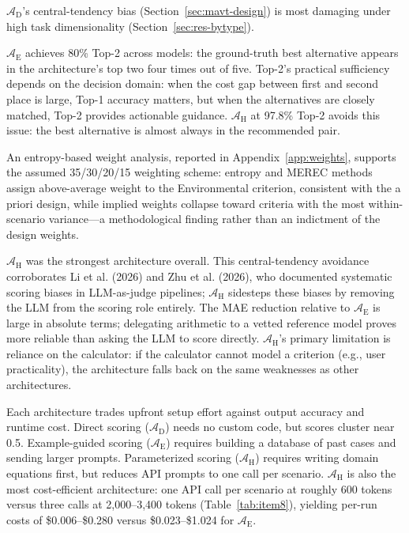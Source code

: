 \documentclass[a4paper,fleqn]{cas-dc}
\begin{document}
$\mathcal{A}_{\text{D}}$'s central-tendency bias (Section~\ref{sec:mavt-design}) is most damaging under high task dimensionality (Section~\ref{sec:res-bytype}).

$\mathcal{A}_{\text{E}}$ achieves 80\% Top-2 across models: the ground-truth best alternative appears in the architecture's top two four times out of five. Top-2's practical sufficiency depends on the decision domain: when the cost gap between first and second place is large, Top-1 accuracy matters, but when the alternatives are closely matched, Top-2 provides actionable guidance. $\mathcal{A}_{\text{H}}$ at 97.8\% Top-2 avoids this issue: the best alternative is almost always in the recommended pair.

An entropy-based weight analysis, reported in Appendix~\ref{app:weights}, supports the assumed 35/30/20/15 weighting scheme: entropy and MEREC methods assign above-average weight to the Environmental criterion, consistent with the a priori design, while implied weights collapse toward criteria with the most within-scenario variance---a methodological finding rather than an indictment of the design weights.

$\mathcal{A}_{\text{H}}$ was the strongest architecture overall. This central-tendency avoidance corroborates Li et al. (2026) and Zhu et al. (2026), who documented systematic scoring biases in LLM-as-judge pipelines; $\mathcal{A}_{\text{H}}$ sidesteps these biases by removing the LLM from the scoring role entirely. The MAE reduction relative to $\mathcal{A}_{\text{E}}$ is large in absolute terms; delegating arithmetic to a vetted reference model proves more reliable than asking the LLM to score directly. $\mathcal{A}_{\text{H}}$'s primary limitation is reliance on the calculator: if the calculator cannot model a criterion (e.g., user practicality), the architecture falls back on the same weaknesses as other architectures.

Each architecture trades upfront setup effort against output accuracy and runtime cost. Direct scoring ($\mathcal{A}_{\text{D}}$) needs no custom code, but scores cluster near 0.5. Example-guided scoring ($\mathcal{A}_{\text{E}}$) requires building a database of past cases and sending larger prompts. Parameterized scoring ($\mathcal{A}_{\text{H}}$) requires writing domain equations first, but reduces API prompts to one call per scenario. $\mathcal{A}_{\text{H}}$ is also the most cost-efficient architecture: one API call per scenario at roughly 600 tokens versus three calls at 2,000--3,400 tokens (Table~\ref{tab:item8}), yielding per-run costs of \$0.006--\$0.280 versus \$0.023--\$1.024 for $\mathcal{A}_{\text{E}}$.
\end{document}
